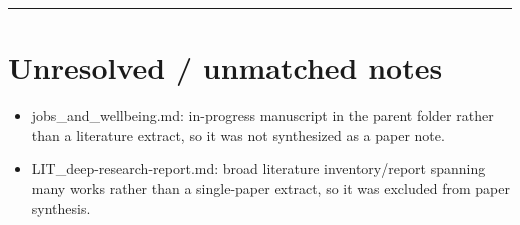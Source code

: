 \documentclass[11pt,a4paper]{article}
\begin{document}
\medskip\hrule\medskip

\section*{Unresolved / unmatched notes}

\begin{itemize}
  \item jobs\_and\_wellbeing.md: in-progress manuscript in the parent folder rather than a literature extract, so it was not synthesized as a paper note.
  \item LIT\_deep-research-report.md: broad literature inventory/report spanning many works rather than a single-paper extract, so it was excluded from paper synthesis.
\end{itemize}
\end{document}
